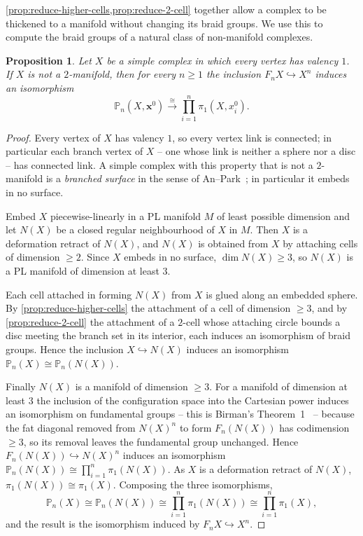 \documentclass[reqno]{amsart}
\newtheorem{proposition}[theorem]{Proposition}
\theoremstyle{definition}
\newcommand\bfx{\mathbf{x}}
\newcommand{\PB}{\mathbb{P}}
\newcommand{\base}{\bfx^0}
\numberwithin{equation}{section}
\begin{document}
\cref{prop:reduce-higher-cells,prop:reduce-2-cell} together allow a complex to be
thickened to a manifold without changing its braid groups. We
use this to compute the braid groups of a natural class of
non-manifold complexes.

\begin{proposition}\label{prop:branched-surface}
Let \(X\) be a simple complex in which every vertex has valency
\(1\). If \(X\) is not a \(2\)-manifold, then for every \(n\geq 1\) the
inclusion \(F_n X\hookrightarrow X^n\) induces an isomorphism
\[
\PB_n(X,\base)\xrightarrow{\ \cong\ }
\prod_{i=1}^n\pi_1(X,x_i^0).
\]
\end{proposition}

\begin{proof}
Every vertex of \(X\) has valency \(1\), so every vertex link is
connected; in particular each branch vertex of \(X\) -- one whose
link is neither a sphere nor a disc -- has connected link. A
simple complex with this property that is not a \(2\)-manifold is
a \emph{branched surface} in the sense of
An--Park~\cite{AnPark2017}; in particular it embeds in no
surface.

Embed \(X\) piecewise-linearly in a PL manifold \(M\) of least
possible dimension and let \(N(X)\) be a closed regular
neighbourhood of \(X\) in \(M\). Then \(X\) is a deformation retract
of \(N(X)\), and \(N(X)\) is obtained from \(X\) by attaching cells of
dimension \(\geq 2\). Since \(X\) embeds in no surface,
\(\dim N(X)\geq 3\), so \(N(X)\) is a PL manifold of dimension at
least \(3\).

Each cell attached in forming \(N(X)\) from \(X\) is glued along an
embedded sphere. By \cref{prop:reduce-higher-cells}
the attachment of a cell of dimension \(\geq 3\), and by
\cref{prop:reduce-2-cell} the attachment of a
\(2\)-cell whose attaching circle bounds a disc meeting the
branch set in its interior, each induces an isomorphism of braid
groups. Hence the inclusion \(X\hookrightarrow N(X)\) induces an
isomorphism \(\PB_n(X)\cong\PB_n(N(X))\).

Finally \(N(X)\) is a manifold of dimension \(\geq 3\). For a
manifold of dimension at least \(3\) the inclusion of the
configuration space into the Cartesian power induces an
isomorphism on fundamental groups -- this is Birman's
Theorem~1~\cite[Thm.~1]{Birman1969} -- because the fat diagonal
removed from \(N(X)^n\) to form \(F_n(N(X))\) has codimension
\(\geq 3\), so its removal leaves the fundamental group unchanged.
Hence \(F_n(N(X))\hookrightarrow N(X)^n\) induces an isomorphism
\(\PB_n(N(X))\cong\prod_{i=1}^n\pi_1(N(X))\). As \(X\) is a
deformation retract of \(N(X)\), \(\pi_1(N(X))\cong\pi_1(X)\).
Composing the three isomorphisms,
\[
\PB_n(X)\cong\PB_n(N(X))\cong\prod_{i=1}^n\pi_1(N(X))
\cong\prod_{i=1}^n\pi_1(X),
\]
and the result is the isomorphism induced by
\(F_n X\hookrightarrow X^n\).
\end{proof}
\end{document}
